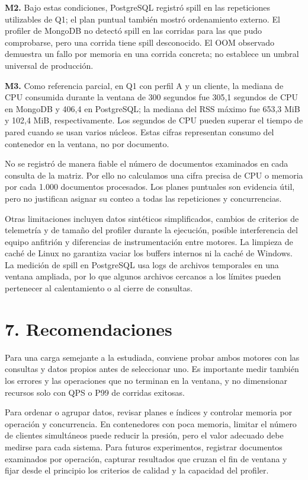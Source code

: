 \documentclass[12pt,letterpaper]{article}
\begin{document}
\textbf{M2.} Bajo estas condiciones, PostgreSQL registró spill en las repeticiones utilizables de Q1; el plan puntual también mostró ordenamiento externo. El profiler de MongoDB no detectó spill en las corridas para las que pudo comprobarse, pero una corrida tiene spill desconocido. El OOM observado demuestra un fallo por memoria en una corrida concreta; no establece un umbral universal de producción.

\textbf{M3.} Como referencia parcial, en Q1 con perfil A y un cliente, la mediana de CPU consumida durante la ventana de 300 segundos fue 305,1 segundos de CPU en MongoDB y 406,4 en PostgreSQL; la mediana del RSS máximo fue 653,3 MiB y 102,4 MiB, respectivamente. Los segundos de CPU pueden superar el tiempo de pared cuando se usan varios núcleos. Estas cifras representan consumo del contenedor en la ventana, no por documento.

No se registró de manera fiable el número de documentos examinados en cada consulta de la matriz. Por ello no calculamos una cifra precisa de CPU o memoria por cada 1.000 documentos procesados. Los planes puntuales son evidencia útil, pero no justifican asignar su conteo a todas las repeticiones y concurrencias.

Otras limitaciones incluyen datos sintéticos simplificados, cambios de criterios de telemetría y de tamaño del profiler durante la ejecución, posible interferencia del equipo anfitrión y diferencias de instrumentación entre motores. La limpieza de caché de Linux no garantiza vaciar los buffers internos ni la caché de Windows. La medición de spill en PostgreSQL usa logs de archivos temporales en una ventana ampliada, por lo que algunos archivos cercanos a los límites pueden pertenecer al calentamiento o al cierre de consultas.

\section*{7. Recomendaciones}
Para una carga semejante a la estudiada, conviene probar ambos motores con las consultas y datos propios antes de seleccionar uno. Es importante medir también los errores y las operaciones que no terminan en la ventana, y no dimensionar recursos solo con QPS o P99 de corridas exitosas.

Para ordenar o agrupar datos, revisar planes e índices y controlar memoria por operación y concurrencia. En contenedores con poca memoria, limitar el número de clientes simultáneos puede reducir la presión, pero el valor adecuado debe medirse para cada sistema. Para futuros experimentos, registrar documentos examinados por operación, capturar resultados que cruzan el fin de ventana y fijar desde el principio los criterios de calidad y la capacidad del profiler.
\end{document}
